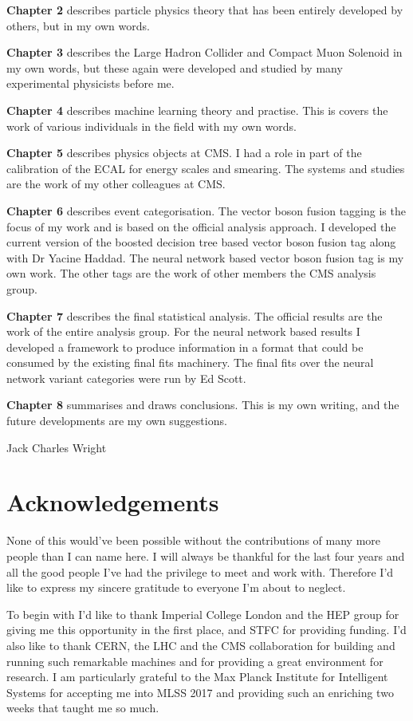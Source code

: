 \textbf{Chapter 2} describes particle physics theory that has been entirely developed by others, but in my own words.

\textbf{Chapter 3} describes the Large Hadron Collider and Compact Muon Solenoid in my own words, but these again were developed and studied by many experimental physicists before me.

\textbf{Chapter 4} describes machine learning theory and practise. This is covers the work of various individuals in the field with my own words.

\textbf{Chapter 5} describes physics objects at CMS. I had a role in part of the calibration of the ECAL for energy scales and smearing. The systems and studies are the work of my other colleagues at CMS.

\textbf{Chapter 6} describes event categorisation. The vector boson fusion tagging is the focus of my work and is based on the official analysis approach. I developed the current version of the boosted decision tree based vector boson fusion tag along with Dr Yacine Haddad. The neural network based vector boson fusion tag is my own work. The other tags are the work of other members the CMS \Hgg analysis group.

\textbf{Chapter 7} describes the final statistical analysis. The official results are the work of the entire \Hgg analysis group. For the neural network based results I developed a framework to produce information in a format that could be consumed by the existing final fits machinery. The final fits over the neural network variant categories were run by Ed Scott.  

\textbf{Chapter 8} summarises and draws conclusions. This is my own writing, and the future developments are my own suggestions.

\begin{flushright}
    Jack Charles Wright
\end{flushright}

\chapter*{\centering Acknowledgements}
None of this would've been possible without the contributions of many more people than I can name here. 
I will always be thankful for the last four years and all the good people I've had the privilege to meet and work with.
Therefore I'd like to express my sincere gratitude to everyone I'm about to neglect. 

To begin with I'd like to thank Imperial College London and the HEP group for giving me this opportunity in the first place, and STFC for providing funding.
I'd also like to thank CERN, the LHC and the CMS collaboration for building and running such remarkable machines and for providing a great environment for research.
I am particularly grateful to the Max Planck Institute for Intelligent Systems for accepting me into MLSS 2017 and providing such an enriching two weeks that taught me so much. 

